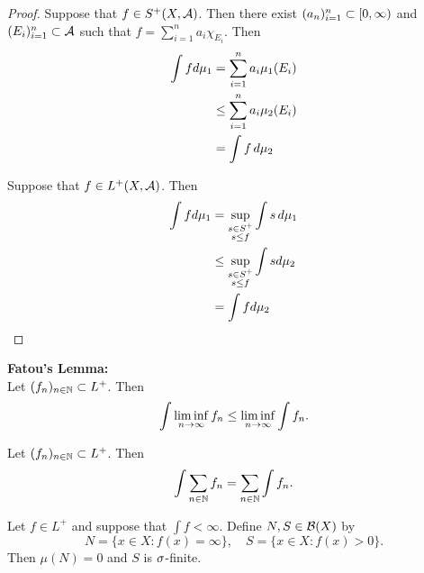 \documentclass{book}
\begin{document}
	\begin{proof}
		\item Suppose that $f \in S^+(X, \mathcal{A})$. Then there exist $(a_n)_{i=1}^n \subset [0,\infty)$ and $(E_i)_{i=1}^n \subset \mathcal{A}$ such that $f = \sum\limits_{i =1}^n a_i \chi_{E_i}$. Then 
		\begin{align*}
			\int f d\mu_1 
			&= \sum\limits_{i =1}^n a_i \mu_1(E_i)\\
			& \leq \sum\limits_{i =1}^n a_i \mu_2(E_i)\\
			&= \int f \, d \mu_2
		\end{align*} 
		
		\item Suppose that $f \in L^+(X, \mathcal{A})$. Then 
		\begin{align*}
			\int f d\mu_1 
			&= \sup\limits_{\substack{s \in S^+\\s \leq f}} \int s \, d \mu_1 \\
			& \leq \sup\limits_{\substack{s \in S^+\\s \leq f}} \int s d\mu_2 \\
			&= \int f d\mu_2
		\end{align*}
	\end{proof}

	\begin{thm}  \textbf{Fatou's Lemma:}\\
		Let $(f_n)_{n \in \mathbb{N}} \subset L^+$. Then 
		$$\int \liminf \limits_{n \rightarrow \infty} f_n \leq \liminf \limits_{n \rightarrow \infty} \int f_n.$$
	\end{thm}
	
	\begin{thm} 
		Let $(f_n)_{n \in \mathbb{N}} \subset L^+$. Then 
		$$\int \sum\limits_{n \in \mathbb{N}} f_n= \sum\limits_{n \in \mathbb{N}} \int f_n.$$
	\end{thm}
	
	\begin{ex} 
		Let $f \in L^+$ and suppose that $\int f < \infty$. Define $N, S \in \mathcal{B}(X)$ by 
		$$N = \{x \in X: f(x) = \infty\}, \quad S = \{x \in X: f(x) > 0\}.$$ 
		Then $\mu(N) = 0$ and $S$ is $\sigma$-finite.
	\end{ex}
	
\end{document}
